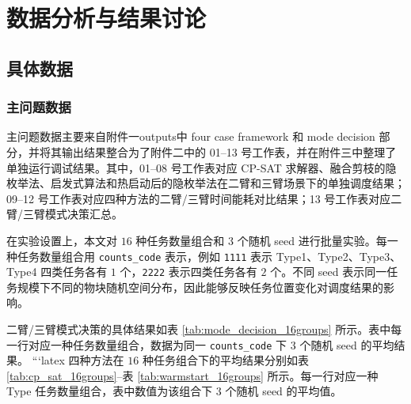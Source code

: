 
\section{数据分析与结果讨论}


\subsection{具体数据}


\subsubsection{主问题数据}

主问题数据主要来自附件一outputs中 four case framework 和 mode decision 部分，并将其输出结果整合为了附件二中的 01--13 号工作表，并在附件三中整理了单独运行调试结果。其中，01--08 号工作表对应 CP-SAT 求解器、融合剪枝的隐枚举法、启发式算法和热启动后的隐枚举法在二臂和三臂场景下的单独调度结果；09--12 号工作表对应四种方法的二臂/三臂时间能耗对比结果；13 号工作表对应二臂/三臂模式决策汇总。

在实验设置上，本文对 $16$ 种任务数量组合和 $3$ 个随机 seed 进行批量实验。每一种任务数量组合用 \texttt{counts\_code} 表示，例如 \texttt{1111} 表示 Type1、Type2、Type3、Type4 四类任务各有 $1$ 个，\texttt{2222} 表示四类任务各有 $2$ 个。不同 seed 表示同一任务规模下不同的物块随机空间分布，因此能够反映任务位置变化对调度结果的影响。

二臂/三臂模式决策的具体结果如表 \ref{tab:mode_decision_16groups} 所示。表中每一行对应一种任务数量组合，数据为同一 \texttt{counts\_code} 下 $3$ 个随机 seed 的平均结果。
```latex
四种方法在 $16$ 种任务组合下的平均结果分别如表 \ref{tab:cp_sat_16groups}--表 \ref{tab:warmstart_16groups} 所示。每一行对应一种 Type 任务数量组合，表中数值为该组合下 $3$ 个随机 seed 的平均值。

